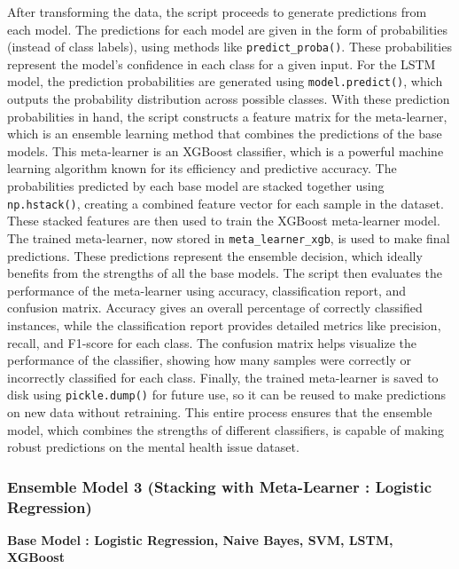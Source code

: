 \vspace{1em}

\noindent
After transforming the data, the script proceeds to generate predictions from each model. The predictions for each model are given in the form of probabilities (instead of class labels), using methods like \texttt{predict\_proba()}. These probabilities represent the model’s confidence in each class for a given input. For the LSTM model, the prediction probabilities are generated using \texttt{model.predict()}, which outputs the probability distribution across possible classes. With these prediction probabilities in hand, the script constructs a feature matrix for the meta-learner, which is an ensemble learning method that combines the predictions of the base models. This meta-learner is an XGBoost classifier, which is a powerful machine learning algorithm known for its efficiency and predictive accuracy. The probabilities predicted by each base model are stacked together using \texttt{np.hstack()}, creating a combined feature vector for each sample in the dataset. These stacked features are then used to train the XGBoost meta-learner model. The trained meta-learner, now stored in \texttt{meta\_learner\_xgb}, is used to make final predictions. These predictions represent the ensemble decision, which ideally benefits from the strengths of all the base models. The script then evaluates the performance of the meta-learner using accuracy, classification report, and confusion matrix. Accuracy gives an overall percentage of correctly classified instances, while the classification report provides detailed metrics like precision, recall, and F1-score for each class. The confusion matrix helps visualize the performance of the classifier, showing how many samples were correctly or incorrectly classified for each class. Finally, the trained meta-learner is saved to disk using \texttt{pickle.dump()} for future use, so it can be reused to make predictions on new data without retraining. This entire process ensures that the ensemble model, which combines the strengths of different classifiers, is capable of making robust predictions on the mental health issue dataset.

\pagebreak
\subsubsection{Ensemble Model 3 (Stacking with Meta-Learner : Logistic Regression)}
\noindent
\textbf{Base Model : Logistic Regression, Naive Bayes, SVM, LSTM, XGBoost}


